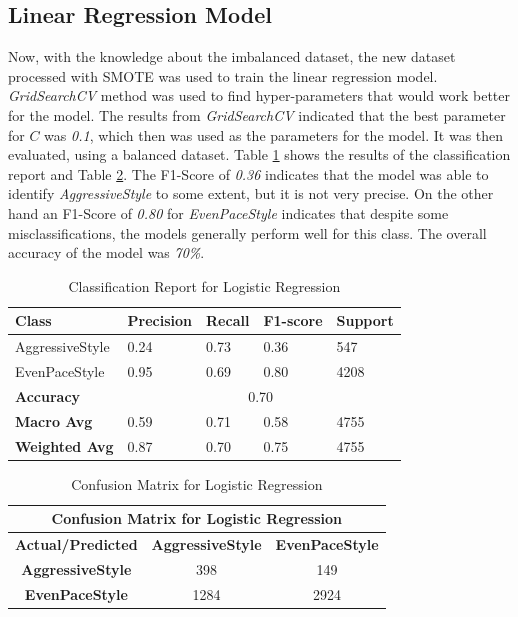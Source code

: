 \documentclass[10pt,journal,compsoc]{IEEEtran}
\begin{document}
\subsection{Linear Regression Model}
Now, with the knowledge about the imbalanced dataset, the new dataset processed with SMOTE was used to train the linear regression model. \textit{GridSearchCV} method was used to 
find hyper-parameters that would work better for the model. The results from \textit{GridSearchCV} indicated that the best parameter for $C$ was \textit{0.1},
which then was used as the parameters for the model. It was then evaluated, using a balanced dataset. Table \ref{table:log_classification_report} shows the results of the classification 
report and Table \ref{table:log_confusion_matrix}. The F1-Score of \textit{0.36} indicates that the model was able to identify \textit{AggressiveStyle} to some extent, but it is not very precise. On the other hand an F1-Score of \textit{0.80} 
for \textit{EvenPaceStyle} indicates that despite some misclassifications, the models generally perform well for this class. The overall accuracy of the model was \textit{70\%}.


\begin{table}[h]
    \centering    
    \begin{tabular}{|l|l|l|l|l|}
    \hline
    \textbf{Class} & \textbf{Precision} & \textbf{Recall} & \textbf{F1-score} & \textbf{Support} \\ \hline
    AggressiveStyle & 0.24 & 0.73 & 0.36 & 547 \\ \hline
    EvenPaceStyle & 0.95 & 0.69 & 0.80 & 4208 \\ \hline
    \textbf{Accuracy} & \multicolumn{4}{c|}{0.70} \\ \hline
    \textbf{Macro Avg} & 0.59 & 0.71 & 0.58 & 4755 \\ \hline
    \textbf{Weighted Avg} & 0.87 & 0.70 & 0.75 & 4755 \\ \hline
    \end{tabular}
    \caption{Classification Report for Logistic Regression}
    \label{table:log_classification_report}
\end{table}

\begin{table}[h]
    \centering
    \begin{tabular}{|c|c|c|}
    \hline
    \multicolumn{3}{|c|}{\textbf{Confusion Matrix for Logistic Regression}} \\
    \hline
    \textbf{Actual/Predicted} & \textbf{AggressiveStyle} & \textbf{EvenPaceStyle} \\ \hline
    \textbf{AggressiveStyle} & 398 & 149 \\ \hline
    \textbf{EvenPaceStyle} & 1284 & 2924 \\ \hline
    \end{tabular}
    \caption{Confusion Matrix for Logistic Regression}
    \label{table:log_confusion_matrix}
\end{table}
\end{document}
